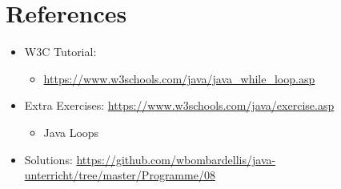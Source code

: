 \documentclass[a4paper]{article}
\begin{document}
	\section{References}
	\begin{itemize}
		\item W3C Tutorial: 
		\begin{itemize}
			\item \url{https://www.w3schools.com/java/java_while_loop.asp}
		\end{itemize}
		\item Extra Exercises: \url{https://www.w3schools.com/java/exercise.asp}
		\begin{itemize}
			\item Java Loops
		\end{itemize}
		\item Solutions: \url{https://github.com/wbombardellis/java-unterricht/tree/master/Programme/08}
	\end{itemize}
\end{document}
